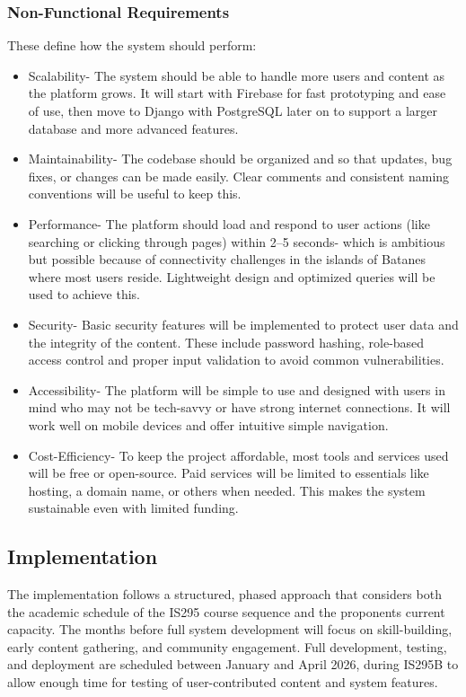         \subsubsection{Non-Functional Requirements}
        These define how the system should perform:
            \begin{itemize}
                \item Scalability- The system should be able to handle more users and content as the platform grows. It will start with Firebase for fast prototyping and ease of use, then move to Django with PostgreSQL later on to support a larger database and more advanced features.
                \item Maintainability- The codebase should be organized and so that updates, bug fixes, or changes can be made easily. Clear comments and consistent naming conventions will be useful to keep this.
                \item Performance- The platform should load and respond to user actions (like searching or clicking through pages) within 2–5 seconds- which is ambitious but possible because of connectivity challenges in the islands of Batanes where most users reside. Lightweight design and optimized queries will be used to achieve this.
                \item Security- Basic security features will be implemented to protect user data and the integrity of the content. These include password hashing, role-based access control and proper input validation to avoid common vulnerabilities.
                \item Accessibility- The platform will be simple to use and designed with users in mind who may not be tech-savvy or have strong internet connections. It will work well on mobile devices and offer intuitive simple navigation.
                \item Cost-Efficiency- To keep the project affordable, most tools and services used will be free or open-source. Paid services will be limited to essentials like hosting, a domain name, or others when needed. This makes the system sustainable even with limited funding.
            \end{itemize}
        
        \subsection{Implementation}
        The implementation follows a structured, phased approach that considers both the academic schedule of the IS295 course sequence and the proponents current capacity. The months before full system development will focus on skill-building, early content gathering, and community engagement. Full development, testing, and deployment are scheduled between January and April 2026, during IS295B to allow enough time for testing of user-contributed content and system features.
